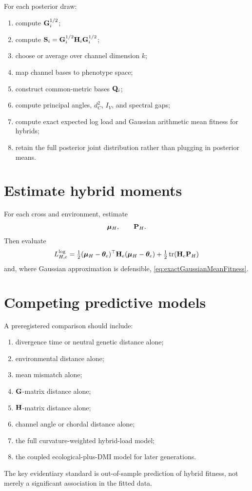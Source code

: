 For each posterior draw:
\begin{enumerate}[leftmargin=1.6em]
\item compute \(\mathbf{G}_i^{1/2}\);
\item compute \(\mathbf{S}_i=\mathbf{G}_i^{1/2}\mathbf{H}_i\mathbf{G}_i^{1/2}\);
\item choose or average over channel dimension \(k\);
\item map channel bases to phenotype space;
\item construct common-metric bases \(\mathbf{Q}_i\);
\item compute principal angles, \(d_C^2\), \(I_V\), and spectral gaps;
\item compute exact expected log load and Gaussian arithmetic mean fitness for hybrids;
\item retain the full posterior joint distribution rather than plugging in posterior means.
\end{enumerate}

\section{Estimate hybrid moments}

For each cross and environment, estimate
\begin{equation}
\boldsymbol{\mu}_H,
\qquad
\mathbf{P}_H.
\end{equation}
Then evaluate
\begin{equation}
L^{\log}_{H,e}
=\tfrac12(\boldsymbol{\mu}_H-\boldsymbol{\theta}_e)^\top\mathbf{H}_e(\boldsymbol{\mu}_H-\boldsymbol{\theta}_e)
+\tfrac12\operatorname{tr}(\mathbf{H}_e\mathbf{P}_H)
\end{equation}
and, where Gaussian approximation is defensible, \cref{eq:exactGaussianMeanFitness}.

\section{Competing predictive models}

A preregistered comparison should include:
\begin{enumerate}[leftmargin=1.6em]
\item divergence time or neutral genetic distance alone;
\item environmental distance alone;
\item mean mismatch alone;
\item \(\mathbf{G}\)-matrix distance alone;
\item \(\mathbf{H}\)-matrix distance alone;
\item channel angle or chordal distance alone;
\item the full curvature-weighted hybrid-load model;
\item the coupled ecological-plus-DMI model for later generations.
\end{enumerate}

The key evidentiary standard is out-of-sample prediction of hybrid fitness, not merely a significant association in the fitted data.
